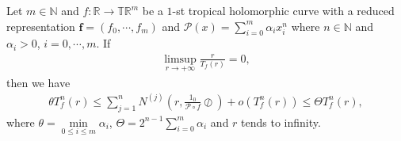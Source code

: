 \documentclass[10pt,a4paper]{amsart}
\begin{document}
\begin{theorem}\label{theorem5.8}
    Let $m\in\mathbb{N}$ and $f:\mathbb{R}\rightarrow \mathbb{T}\mathbb{R}^{m}$ be a $1$-st tropical holomorphic curve with a reduced representation $\textbf{f}=(f_{0}, \cdots, f_{m})$ and $\mathcal{P}(x)=\sum_{i=0}^{m}\alpha_{i}x_{i}^{n}$ where $n\in\mathbb{N}$ and $\alpha_{i}>0$, $i=0, \cdots, m$. If
    \begin{eqnarray}\label{5f1}
        \limsup\limits_{r\rightarrow +\infty}\frac{r}{T_{f}(r)}=0,
    \end{eqnarray}
    then we have
    \begin{eqnarray}\label{5f2}
        \theta T_{f}^{n}(r)\leq \sum_{j=1}^{n}N^{(j)}\left(r, \frac{1_{0}}{\mathcal{P}\circ f}\oslash\right)+o(T_{f}^{n}(r))\leq \Theta T_{f}^{n}(r),
    \end{eqnarray}
    where $\theta=\min\limits_{0\leq i\leq m}\alpha_{i}$, $\Theta=2^{n-1}\sum_{i=0}^{m}\alpha_{i}$ and $r$ tends to infinity.
\end{theorem}
\end{document}
